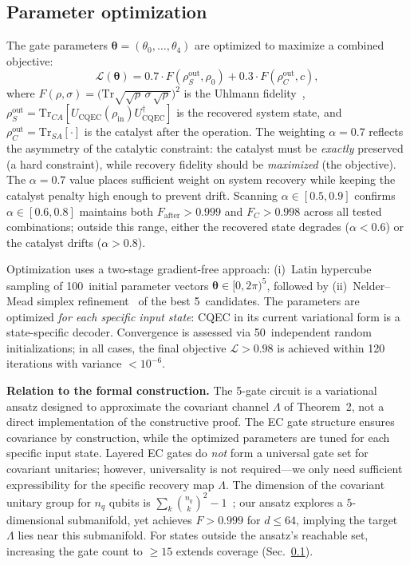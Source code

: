 \documentclass[prx,twocolumn,superscriptaddress,longbibliography,floatfix]{revtex4-2}
\begin{document}
\subsection{Parameter optimization}
\label{sec:optimization}

The gate parameters $\boldsymbol{\theta} = (\theta_0, \ldots, \theta_4)$ are optimized to maximize a combined objective:
\begin{equation}
\mathcal{L}(\boldsymbol{\theta}) = 0.7 \cdot F(\rho_S^\mathrm{out}, \rho_0) + 0.3 \cdot F(\rho_C^\mathrm{out}, c),
\label{eq:objective}
\end{equation}
where $F(\rho, \sigma) = \bigl(\mathrm{Tr}\sqrt{\sqrt{\rho}\,\sigma\,\sqrt{\rho}}\bigr)^2$ is the Uhlmann fidelity~\cite{Jozsa1994}, $\rho_S^\mathrm{out} = \mathrm{Tr}_{CA}[U_\mathrm{CQEC}(\rho_\mathrm{in})U_\mathrm{CQEC}^\dagger]$ is the recovered system state, and $\rho_C^\mathrm{out} = \mathrm{Tr}_{SA}[\cdot]$ is the catalyst after the operation.
The weighting $\alpha = 0.7$ reflects the asymmetry of the catalytic constraint: the catalyst must be \emph{exactly} preserved (a hard constraint), while recovery fidelity should be \emph{maximized} (the objective).
The $\alpha = 0.7$ value places sufficient weight on system recovery while keeping the catalyst penalty high enough to prevent drift.
Scanning $\alpha \in [0.5, 0.9]$ confirms $\alpha \in [0.6, 0.8]$ maintains both $F_\mathrm{after} > 0.999$ and $F_C > 0.998$ across all tested combinations; outside this range, either the recovered state degrades ($\alpha < 0.6$) or the catalyst drifts ($\alpha > 0.8$).

Optimization uses a two-stage gradient-free approach: (i)~Latin hypercube sampling of 100~initial parameter vectors $\boldsymbol{\theta} \in [0, 2\pi)^5$, followed by (ii)~Nelder--Mead simplex refinement~\cite{NelderMead1965} of the best 5~candidates.
The parameters are optimized \emph{for each specific input state}: CQEC in its current variational form is a state-specific decoder.
Convergence is assessed via 50~independent random initializations; in all cases, the final objective $\mathcal{L} > 0.98$ is achieved within 120 iterations with variance $< 10^{-6}$.

\textbf{Relation to the formal construction.}
The 5-gate circuit is a variational ansatz designed to approximate the covariant channel $\Lambda$ of Theorem~2, not a direct implementation of the constructive proof.
The EC gate structure ensures covariance by construction, while the optimized parameters are tuned for each specific input state.
Layered EC gates do \emph{not} form a universal gate set for covariant unitaries; however, universality is not required---we only need sufficient expressibility for the specific recovery map $\Lambda$.
The dimension of the covariant unitary group for $n_q$ qubits is $\sum_k \binom{n_q}{k}^2 - 1$~\cite{Schuch2004}; our ansatz explores a $5$-dimensional submanifold, yet achieves $F > 0.999$ for $d \leq 64$, implying the target $\Lambda$ lies near this submanifold.
For states outside the ansatz's reachable set, increasing the gate count to $\geq 15$ extends coverage (Sec.~\ref{sec:optimization}).
\end{document}
